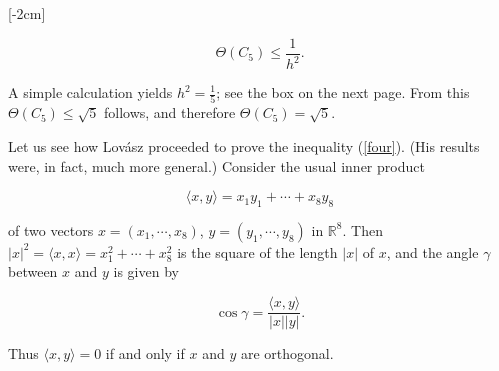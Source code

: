 \documentclass[openany,12pt]{memoir}
\newcommand{\setnewpagemargins}{
    \clearpage
    \setulmarginsandblock{2cm}{0.5cm}{*}
    \checkandfixthelayout
}
\begin{document}
[-2cm]

\begin{equation}
  \Theta(C_5) \leq \frac{1}{h^2}. \label{four}
\end{equation}

A simple calculation yields $h^2 = \frac{1}{5}$; see the box on the next page. From   
this $\Theta(C_5) \leq \sqrt{5}$ follows, and therefore $\Theta(C_5) = \sqrt{5}$.


\setnewpagemargins

Let us see how Lov\'asz proceeded to prove the inequality (\ref{four}). (His results 
were, in fact, much more general.) Consider the usual inner product 

\begin{equation*}
  \langle x,y \rangle = x_1y_1 + \dotsb + x_8y_8
\end{equation*}

of two vectors $x = (x_1, \dotsb, x_8)$, $y = (y_1, \dotsb, y_8)$ in $\mathbb{R}^8$.
Then $|x|^2 = \langle x,x \rangle = x_1^2 + \dotsb + x_8^2$ is the square of the length $|x|$
of $x$, and the angle $\gamma$ between $x$ and $y$ is given by

\begin{equation*}
  \cos \gamma = \frac{\langle x,y \rangle}{|x||y|}.
\end{equation*}

Thus $\langle x,y \rangle = 0$ if and only if $x$ and $y$ are orthogonal.\\
\end{document}
